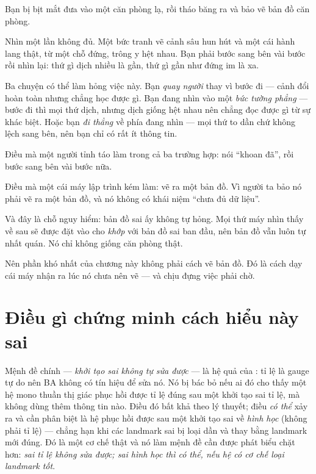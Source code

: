 \documentclass[../../vslam.tex]{subfiles}
\begin{document}
\begin{dongian}
Bạn bị bịt mắt đưa vào một căn phòng lạ, rồi tháo băng ra và bảo vẽ bản đồ căn phòng.

Nhìn một lần không đủ. Một bức tranh vẽ cảnh sâu hun hút và một cái hành lang thật, từ một chỗ đứng, trông y hệt nhau. Bạn phải bước sang bên vài bước rồi nhìn lại: thứ gì dịch nhiều là gần, thứ gì gần như đứng im là xa.

Ba chuyện có thể làm hỏng việc này. Bạn \emph{quay người} thay vì bước đi --- cảnh đổi hoàn toàn nhưng chẳng học được gì. Bạn đang nhìn vào một \emph{bức tường phẳng} --- bước đi thì mọi thứ dịch, nhưng dịch giống hệt nhau nên chẳng đọc được gì từ sự khác biệt. Hoặc bạn \emph{đi thẳng} về phía đang nhìn --- mọi thứ to dần chứ không lệch sang bên, nên bạn chỉ có rất ít thông tin.

Điều mà một người tỉnh táo làm trong cả ba trường hợp: nói ``khoan đã'', rồi bước sang bên vài bước nữa.

Điều mà một cái máy lập trình kém làm: vẽ ra một bản đồ. Vì người ta bảo nó phải vẽ ra một bản đồ, và nó không có khái niệm ``chưa đủ dữ liệu''.

Và đây là chỗ nguy hiểm: bản đồ sai ấy không tự hỏng. Mọi thứ máy nhìn thấy về sau sẽ được đặt vào cho \emph{khớp} với bản đồ sai ban đầu, nên bản đồ vẫn luôn tự nhất quán. Nó chỉ không giống căn phòng thật.

Nên phần khó nhất của chương này không phải cách vẽ bản đồ. Đó là cách dạy cái máy nhận ra lúc nó chưa nên vẽ --- và chịu đựng việc phải chờ.

\end{dongian}

\section{Điều gì chứng minh cách hiểu này sai}

Mệnh đề chính --- \emph{khởi tạo sai không tự sửa được} --- là hệ quả của : tỉ lệ là gauge tự do nên BA không có tín hiệu để sửa nó. Nó bị bác bỏ nếu ai đó cho thấy một hệ mono thuần thị giác phục hồi được tỉ lệ đúng sau một khởi tạo sai tỉ lệ, mà không dùng thêm thông tin nào. Điều đó bất khả theo lý thuyết; điều \emph{có thể} xảy ra và cần phân biệt là hệ phục hồi được sau một khởi tạo sai về \emph{hình học} (không phải tỉ lệ) --- chẳng hạn khi các landmark sai bị loại dần và thay bằng landmark mới đúng. Đó là một cơ chế thật và nó làm mệnh đề cần được phát biểu chặt hơn: \emph{sai tỉ lệ không sửa được; sai hình học thì có thể, nếu hệ có cơ chế loại landmark tốt}.
\end{document}
